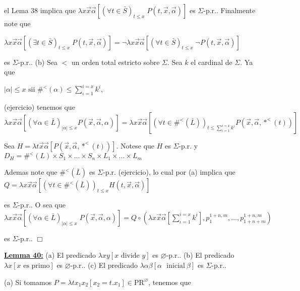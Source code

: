 el Lema 38 implica que \(\lambda x\vec{x}\vec{\alpha}\left[ (\forall t\in \bar{S})_{t\leq x}\;P(t,\vec{x},\vec{\alpha})\right] \) es \( \Sigma \)-p.r..
Finalmente note que

\(\displaystyle \lambda x\vec{x}\vec{\alpha}\left[ (\exists t\in \bar{S})_{t\leq x}\;P(t, \vec{x},\vec{\alpha})\right] =\lnot \lambda x\vec{x}\vec{\alpha}\left[ (\forall t\in \bar{S})_{t\leq x}\;\lnot P(t,\vec{x},\vec{\alpha})\right] \)

es \(\Sigma \)-p.r..
(b) Sea \(< \) un orden total estricto sobre \(\Sigma .\) Sea \(k\) el cardinal de \( \Sigma \). Ya que

\(\displaystyle \left\vert \alpha \right\vert \leq x\text{ sii }\#^{< }(\alpha )\leq \sum_{\iota =1}^{i=x}k^{i}, \)

(ejercicio) tenemos que
\(\displaystyle \lambda x\vec{x}\vec{\alpha}\left[ (\forall \alpha \in \bar{L})_{\left\vert \alpha \right\vert \leq x}P(\vec{x},\vec{\alpha},\alpha )\right] =\lambda x \vec{x}\vec{\alpha}\left[ (\forall t\in \#^{< }(\bar{L}))_{t\leq \sum_{\iota =1}^{i=x}k^{i}}P(\vec{x},\vec{\alpha},\ast ^{< }(t))\right] \)

Sea \(H=\lambda t\vec{x}\vec{\alpha}\left[ P(\vec{x},\vec{\alpha},\ast ^{< }(t))\right] .\) Notese que \(H\) es \(\Sigma \)-p.r. y
\(\displaystyle D_{H}=\#^{< }(L)\times S_{1}\times ...\times S_{n}\times L_{1}\times ...\times L_{m} \)

Ademas note que \(\#^{< }(\bar{L})\) es \(\Sigma \)-p.r. (ejercicio), lo cual por (a) implica que
\(\displaystyle Q=\lambda x\vec{x}\vec{\alpha}\left[ (\forall t\in \#^{< }(\bar{L}))_{t\leq x}H(t,\vec{x},\vec{\alpha})\right] \)

es \(\Sigma \)-p.r.. O sea que
\(\displaystyle \lambda x\vec{x}\vec{\alpha}\left[ (\forall \alpha \in \bar{L})_{\left\vert \alpha \right\vert \leq x}\;P(\vec{x},\vec{\alpha},\alpha )\right] =Q\circ \left( \lambda x\vec{x}\vec{\alpha}\left[ \sum\limits_{\iota =1}^{i=x}k^{i} \right] ,p_{1}^{1+n,m},...,p_{1+n+m}^{1+n,m}\right) \)

es \(\Sigma \)-p.r.. \(\Box\)


\textbf{\underline{Lemma 40:}}
(a) El predicado \(\lambda xy\left[ x\text{ divide }y\right] \) es \( \varnothing \)-p.r..
(b) El predicado \(\lambda x\left[ x\text{ es primo}\right] \) es \( \varnothing \)-p.r..
(c) El predicado \(\lambda \alpha \beta \left[ \alpha \text{\ }\mathrm{ inicial}\ \beta \right] \) es \(\Sigma \)-p.r..

\PROOF (a) Si tomamos \(P=\lambda tx_{1}x_{2}\left[ x_{2}=t.x_{1}\right] \in \mathrm{PR}^{\varnothing }\), tenemos que

